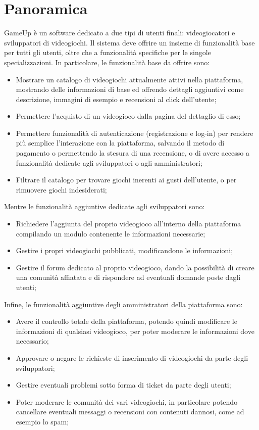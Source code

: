 \section{Panoramica}
GameUp è un software dedicato a due tipi di utenti finali: videogiocatori e sviluppatori di videogiochi. Il sistema deve offrire un insieme di funzionalità base per tutti gli utenti, oltre che a funzionalità specifiche per le singole specializzazioni.
In particolare, le funzionalità base da offrire sono:
\begin{itemize}
\item Mostrare un catalogo di videogiochi attualmente attivi nella piattaforma, mostrando delle informazioni di base ed offrendo dettagli aggiuntivi come descrizione, immagini di esempio e recensioni al click dell’utente;
\item Permettere l’acquisto di un videogioco dalla pagina del dettaglio di esso;
\item Permettere funzionalità di autenticazione (registrazione e log-in) per rendere più semplice l’interazione con la piattaforma, salvando il metodo di pagamento o permettendo la stesura di una recensione, o di avere accesso a funzionalità dedicate agli sviluppatori o agli amministratori;
\item Filtrare il catalogo per trovare giochi inerenti ai gusti dell’utente, o per rimuovere giochi indesiderati;
\end{itemize}
Mentre le funzionalità aggiuntive dedicate agli sviluppatori sono:
\begin{itemize}
\item Richiedere l’aggiunta del proprio videogioco all’interno della piattaforma compilando un modulo contenente le informazioni necessarie;
\item Gestire i propri videogiochi pubblicati, modificandone le informazioni;
\item Gestire il forum dedicato al proprio videogioco, dando la possibilità di creare una comunità affiatata e di rispondere ad eventuali domande poste dagli utenti;
\end{itemize}
Infine, le funzionalità aggiuntive degli amministratori della piattaforma sono:
\begin{itemize}
\item Avere il controllo totale della piattaforma, potendo quindi modificare le informazioni di qualsiasi videogioco, per poter moderare le informazioni dove necessario;
\item Approvare o negare le richieste di inserimento di videogiochi da parte degli sviluppatori;
\item Gestire eventuali problemi sotto forma di ticket da parte degli utenti;
\item Poter moderare le comunità dei vari videogiochi, in particolare potendo cancellare eventuali messaggi o recensioni con contenuti dannosi, come ad esempio lo spam;
\end{itemize}

